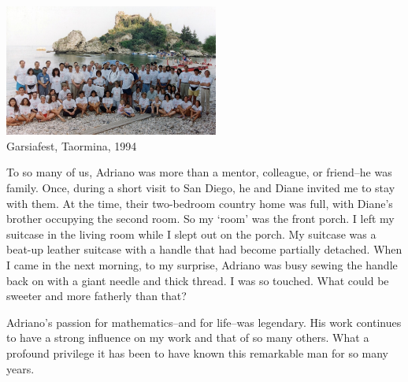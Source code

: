 \documentclass{notices}
\begin{document}
\begin{center}
 \includegraphics[height=1.7in]{Michelle_Wachs/EmbeddedImage.jpeg} 
 \\ {\footnotesize Garsiafest, Taormina, 1994}
\end{center}

To so many of us, Adriano was more than a mentor, colleague, or friend--he was family.  Once, during a short visit to San Diego, he and Diane invited me to stay with them. At the time, their two-bedroom country home  was full, with Diane's brother occupying the second room.  So my `room' was the front porch.   I left my suitcase in the living room while I slept out on the porch.  My suitcase was a  beat-up leather suitcase with a handle that had become partially detached.  When I came in the next morning, to my surprise, Adriano  was busy sewing the handle back on with a giant needle and thick thread. I was so touched. What could be sweeter and more fatherly than that?  

Adriano's passion for mathematics--and for life--was legendary.  His work continues to have a strong influence on my work and that of so many others.  What a profound privilege it has been to have known this remarkable man for so many years.
\end{document}

